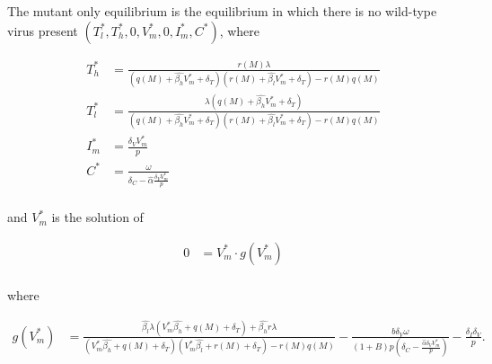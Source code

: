 \documentclass[11pt, oneside]{article}    %
\begin{document}
The mutant only equilibrium is the equilibrium in which there is no wild-type virus present $(T_l^*, T_h^*,0,V_m^*,0,I_m^*,C^*)$, where

\begin{align*}
T_h^* & = \frac{r(M) \lambda}{(q(M) + \hat{\beta_h} V_m^* + \delta_T) ( r(M)+ \hat{\beta_l} V_m^* + \delta_T) -r(M)q(M)} \\
T_l^*  & = \frac{\lambda (q(M) + \hat{\beta_h} V_m^* +\delta_T)}{(q(M) + \hat{\beta_h} V_m^* + \delta_T) ( r(M)+ \hat{\beta_l} V_m^* + \delta_T) -r(M)q(M)} \\
I_m^* & = \frac{\delta_V V_m^*}{p}\\
C^* & = \frac{\omega}{\delta_C - \hat{\alpha} \frac{\delta_V V_m^*}{p}} \\
\end{align*}



and $ V_m^*$ is the solution of

\begin{align*}
0 &= V_m^* \cdot g(V_m^*) \\%
\end{align*}

where

\begin{align*}
g(V_m^*) & = \frac{\hat{\beta_l} \lambda \left(V_m^* \hat{\beta_h} + q(M) + \delta_T \right) + \hat{\beta_h} r \lambda   }   {\left(V_m^* \hat{\beta_h} + q(M) + \delta_T \right)  
  \left(V_m^* \hat{\beta_l} + r(M)+\delta_T \right) - r(M)q(M)} -  \frac{b \delta_V \omega}{ \left(1+B\right) p \left( \delta_C - \frac{\hat{\alpha} \delta_V V_m^*}{p}  \right)  }      
- \frac{\delta_I \delta_V}{p} . \\
\end{align*}
\end{document}
